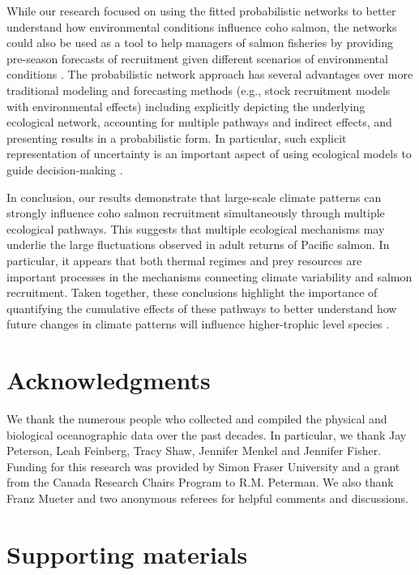 While our research focused on using the fitted probabilistic networks to better
understand how environmental conditions influence coho salmon, the networks
could also be used as a tool to help managers of salmon fisheries by providing
pre-season forecasts of recruitment given different scenarios of environmental
conditions \citep{Nyberg2006a, Araujo2013}. The probabilistic network approach
has several advantages over more traditional modeling and forecasting methods
(e.g., stock recruitment models with environmental effects) including explicitly
depicting the underlying ecological network, accounting for multiple pathways
and indirect effects, and presenting results in a probabilistic form. In
particular, such explicit representation of uncertainty is an important aspect
of using ecological models to guide decision-making \citep{Clark2001a}.

In conclusion, our results demonstrate that large-scale climate patterns can
strongly influence coho salmon recruitment simultaneously through multiple
ecological pathways. This suggests that multiple ecological mechanisms may
underlie the large fluctuations observed in adult returns of Pacific salmon. In
particular, it appears that both thermal regimes and prey resources are
important processes in the mechanisms connecting climate variability and salmon
recruitment. Taken together, these conclusions highlight the importance of
quantifying the cumulative effects of these pathways to better understand how
future changes in climate patterns will influence higher-trophic level species
\citep{Ainsworth2011a, Fulton2011}.



\section{Acknowledgments}

We thank the numerous people who collected and compiled the physical and
biological oceanographic data over the past decades. In particular, we thank Jay
Peterson, Leah Feinberg, Tracy Shaw, Jennifer Menkel and Jennifer Fisher.
Funding for this research was provided by Simon Fraser University and a grant
from the Canada Research Chairs Program to R.M.  Peterman. We also thank Franz
Mueter and two anonymous referees for helpful comments and discussions.



\section{Supporting materials}

